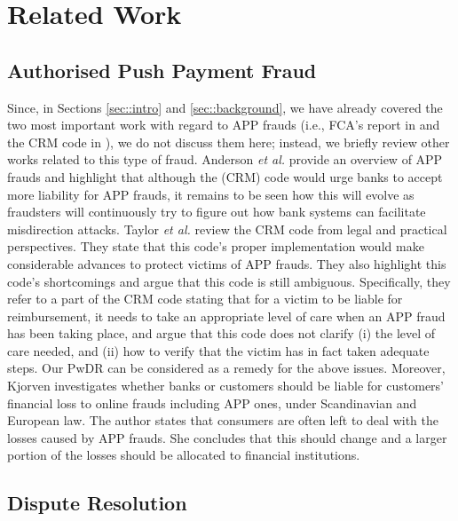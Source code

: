 
\section{Related Work}


\subsection{Authorised Push Payment Fraud}

Since, in Sections \ref{sec::intro} and \ref{sec::background}, we have already covered the two most important work  with regard to APP frauds  (i.e.,  FCA's  report in \cite{2021-Half-Year-Fraud-Update} and the CRM code in \cite{CRM-code}), we do not discuss them here; instead,  we briefly  review other works related to this type of fraud. Anderson \textit{et al.} \cite{anderson2019measuring} provide an overview of APP frauds and highlight that although  the (CRM) code would urge  banks to accept more liability for APP frauds, it remains to be seen how this will evolve as   fraudsters will continuously try to figure out how bank systems can facilitate misdirection attacks. Taylor \textit{et al.} \cite{taylor2020new} review the CRM code from legal and practical perspectives. They  state that this code's proper implementation would make considerable advances to protect victims of APP frauds. They also highlight this code's shortcomings and argue that this code is still ambiguous. Specifically, they refer to a part of the  CRM code  stating that for a victim to be liable for reimbursement,  it needs to take an appropriate level of  care when an APP fraud has been taking place, and argue that   this  code does not  clarify (i)  the level of care needed,  and (ii) how to verify that the victim has in fact taken adequate steps. Our PwDR  can be considered as a remedy for the above issues.   Moreover, Kjorven \cite{kjorven2020pays} investigates whether banks or customers should be liable for customers' financial loss to online  frauds including APP ones, under Scandinavian and European law. The author states  that consumers are often left to deal with the losses caused by APP frauds. She concludes that this should change and  a larger portion of the losses should be allocated to financial institutions.


\subsection{Dispute Resolution}

